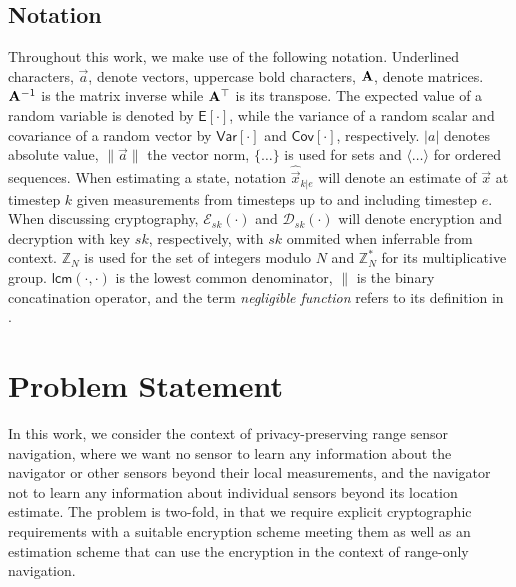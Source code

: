 \documentclass[10pt,letterpaper,oneside,twocolumn,journal]{IEEEtran}
\theoremstyle{definition}
\theoremstyle{definition}
\theoremstyle{remark}
\begin{document}
\subsection{Notation}
Throughout this work, we make use of the following notation. Underlined characters, $\vec{a}$, denote vectors, uppercase bold characters, ${{\mathbf{A}}}$, denote matrices. ${{\mathbf{A}}}^{-1}$ is the matrix inverse while ${{\mathbf{A}}}^\top$ is its transpose. The expected value of a random variable is denoted by $\mathsf{E}[\cdot]$, while the variance of a random scalar and covariance of a random vector by $\mathsf{Var}[\cdot]$ and $\mathsf{Cov}[\cdot]$, respectively. $|a|$ denotes absolute value, $\lVert\vec{a}\rVert$ the vector norm, $\{\dots\}$ is used for sets and $\langle\dots\rangle$ for ordered sequences. When estimating a state, notation $\hat{\vec{x}}_{k|e}$ will denote an estimate of $\vec{x}$ at timestep $k$ given measurements from timesteps up to and including timestep $e$. When discussing cryptography, $\mathcal{E}_{sk}(\cdot)$ and $\mathcal{D}_{sk}(\cdot)$ will denote encryption and decryption with key $sk$, respectively, with $sk$ ommited when inferrable from context. $\mathbb{Z}_N$ is used for the set of integers modulo $N$ and $\mathbb{Z}^*_N$ for its multiplicative group. $\mathsf{lcm}(\cdot,\cdot)$ is the lowest common denominator, $\|$ is the binary concatination operator, and the term \textit{negligible function} refers to its definition in \cite{katzIntroductionModernCryptography2008}.

% 
%                                                                                
%                                                                                
%                                                                                
% 

\section{Problem Statement} \label{sec:problem_statement}
In this work, we consider the context of privacy-preserving range sensor navigation, where we want no sensor to learn any information about the navigator or other sensors beyond their local measurements, and the navigator not to learn any information about individual sensors beyond its location estimate. The problem is two-fold, in that we require explicit cryptographic requirements with a suitable encryption scheme meeting them as well as an estimation scheme that can use the encryption in the context of range-only navigation.
\end{document}
